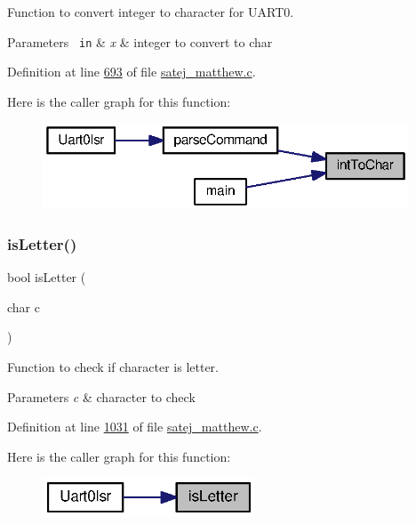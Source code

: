 Function to convert integer to character for U\+A\+R\+T0. 


\begin{DoxyParams}[1]{Parameters}
\mbox{\texttt{ in}}  & {\em x} & integer to convert to char \\
\hline
\end{DoxyParams}


Definition at line \mbox{\hyperlink{satej__matthew_8c_source_l00693}{693}} of file \mbox{\hyperlink{satej__matthew_8c_source}{satej\+\_\+matthew.\+c}}.

Here is the caller graph for this function\+:
\nopagebreak
\begin{figure}[H]
\begin{center}
\leavevmode
\includegraphics[width=309pt]{satej__matthew_8c_a48ff33038777eac27bf41ff14b9368bf_icgraph}
\end{center}
\end{figure}
\mbox{\label{satej__matthew_8c_a19ec769227acc123bfe1e2d225a211cb}} 
\subsubsection{\texorpdfstring{isLetter()}{isLetter()}}
{\footnotesize\ttfamily bool is\+Letter (\begin{DoxyParamCaption}\item[{char}]{c }\end{DoxyParamCaption})}



Function to check if character is letter. 


\begin{DoxyParams}{Parameters}
{\em c} & character to check \\
\hline
\end{DoxyParams}


Definition at line \mbox{\hyperlink{satej__matthew_8c_source_l01031}{1031}} of file \mbox{\hyperlink{satej__matthew_8c_source}{satej\+\_\+matthew.\+c}}.

Here is the caller graph for this function\+:
\nopagebreak
\begin{figure}[H]
\begin{center}
\leavevmode
\includegraphics[width=179pt]{satej__matthew_8c_a19ec769227acc123bfe1e2d225a211cb_icgraph}
\end{center}
\end{figure}
\mbox{\label{satej__matthew_8c_a65b1640156c68ea7687a41428022c1d8}} 
